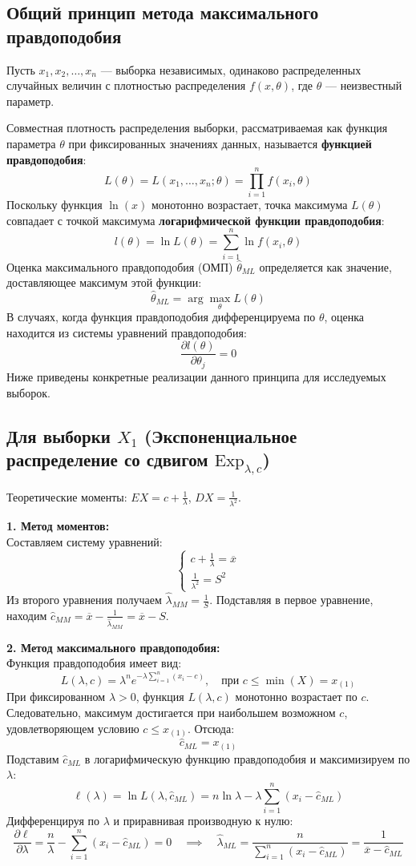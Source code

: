 \documentclass[a4paper,12pt]{article}
\begin{document}
\subsection*{Общий принцип метода максимального правдоподобия}

Пусть $x_1, x_2, \dots, x_n$ --- выборка независимых, одинаково распределенных случайных величин с плотностью распределения $f(x, \theta)$, где $\theta$ --- неизвестный параметр. 

Совместная плотность распределения выборки, рассматриваемая как функция параметра $\theta$ при фиксированных значениях данных, называется \textbf{функцией правдоподобия}:
\[
L(\theta) = L(x_1, \dots, x_n; \theta) = \prod_{i=1}^{n} f(x_i, \theta)
\]
Поскольку функция $\ln(x)$ монотонно возрастает, точка максимума $L(\theta)$ совпадает с точкой максимума \textbf{логарифмической функции правдоподобия}:
\[
l(\theta) = \ln L(\theta) = \sum_{i=1}^{n} \ln f(x_i, \theta)
\]
Оценка максимального правдоподобия (ОМП) $\hat{\theta}_{ML}$ определяется как значение, доставляющее максимум этой функции:
\[
\hat{\theta}_{ML} = \arg\max_{\theta} L(\theta)
\]
В случаях, когда функция правдоподобия дифференцируема по $\theta$, оценка находится из системы уравнений правдоподобия:
\[
\frac{\partial l(\theta)}{\partial \theta_j} = 0
\]
Ниже приведены конкретные реализации данного принципа для исследуемых выборок.

\subsection*{Для выборки $X_1$ (Экспоненциальное распределение со сдвигом $\text{Exp}_{\lambda,c}$)}

Теоретические моменты: $EX = c + \frac{1}{\lambda}$, $DX = \frac{1}{\lambda^2}$.

\textbf{1. Метод моментов:}\\
Составляем систему уравнений:
$$
\begin{cases}
c + \frac{1}{\lambda} = \overline{x} \\
\frac{1}{\lambda^2} = S^2
\end{cases}
$$
Из второго уравнения получаем $\hat{\lambda}_{MM} = \frac{1}{S}$. Подставляя в первое уравнение, находим $\hat{c}_{MM} = \overline{x} - \frac{1}{\hat{\lambda}_{MM}} = \overline{x} - S$.

\textbf{2. Метод максимального правдоподобия:}\\
Функция правдоподобия имеет вид:
$$
L(\lambda,c) = \lambda^n e^{-\lambda\sum_{i=1}^{n}(x_i-c)}, \quad \text{при } c \le \min(X) = x_{(1)}
$$
При фиксированном $\lambda > 0$, функция $L(\lambda,c)$ монотонно возрастает по $c$. Следовательно, максимум достигается при наибольшем возможном $c$, удовлетворяющем условию $c \le x_{(1)}$. Отсюда:
$$
\hat{c}_{ML} = x_{(1)}
$$
Подставим $\hat{c}_{ML}$ в логарифмическую функцию правдоподобия и максимизируем по $\lambda$:
$$
\ell(\lambda) = \ln L(\lambda, \hat{c}_{ML}) = n\ln\lambda - \lambda\sum_{i=1}^{n}(x_i - \hat{c}_{ML})
$$
Дифференцируя по $\lambda$ и приравнивая производную к нулю:
$$
\frac{\partial\ell}{\partial\lambda} = \frac{n}{\lambda} - \sum_{i=1}^{n}(x_i - \hat{c}_{ML}) = 0 \quad \implies \quad \hat{\lambda}_{ML} = \frac{n}{\sum_{i=1}^{n}(x_i - \hat{c}_{ML})} = \frac{1}{\overline{x} - \hat{c}_{ML}}
$$
\end{document}
